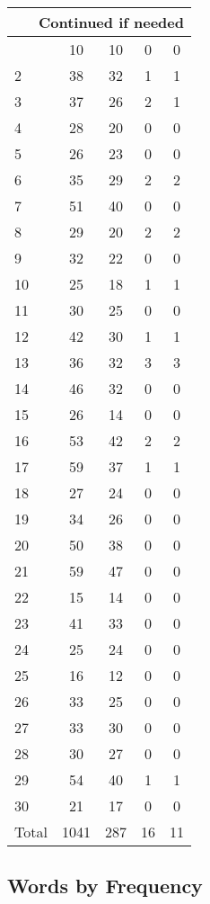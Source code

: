 \begin{center}
\begin{longtable}{l|c|c|c|c}
\hline \multicolumn{5}{|r|}{{Continued if needed}} \\ \hline
\endfoot 
1 & 10 & 10 & 0 & 0\\ \hline
2 & 38 & 32 & 1 & 1\\ \hline
3 & 37 & 26 & 2 & 1\\ \hline
4 & 28 & 20 & 0 & 0\\ \hline
5 & 26 & 23 & 0 & 0\\ \hline
6 & 35 & 29 & 2 & 2\\ \hline
7 & 51 & 40 & 0 & 0\\ \hline
8 & 29 & 20 & 2 & 2\\ \hline
9 & 32 & 22 & 0 & 0\\ \hline
10 & 25 & 18 & 1 & 1\\ \hline
11 & 30 & 25 & 0 & 0\\ \hline
12 & 42 & 30 & 1 & 1\\ \hline
13 & 36 & 32 & 3 & 3\\ \hline
14 & 46 & 32 & 0 & 0\\ \hline
15 & 26 & 14 & 0 & 0\\ \hline
16 & 53 & 42 & 2 & 2\\ \hline
17 & 59 & 37 & 1 & 1\\ \hline
18 & 27 & 24 & 0 & 0\\ \hline
19 & 34 & 26 & 0 & 0\\ \hline
20 & 50 & 38 & 0 & 0\\ \hline
21 & 59 & 47 & 0 & 0\\ \hline
22 & 15 & 14 & 0 & 0\\ \hline
23 & 41 & 33 & 0 & 0\\ \hline
24 & 25 & 24 & 0 & 0\\ \hline
25 & 16 & 12 & 0 & 0\\ \hline
26 & 33 & 25 & 0 & 0\\ \hline
27 & 33 & 30 & 0 & 0\\ \hline
28 & 30 & 27 & 0 & 0\\ \hline
29 & 54 & 40 & 1 & 1\\ \hline
30 & 21 & 17 & 0 & 0\\ \hline
\hline \hline
Total & 1041 & 287 & 16 & 11



\end{longtable}
\end{center}

 
\subsection{Words by Frequency}

